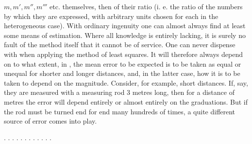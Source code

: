 $m, m', m'', m'''$ etc. themselves, then of their ratio (i. e. the ratio of the numbers by which they are expressed, with arbitrary units chosen for each in the heterogeneous case). With ordinary ingenuity one can almost always find at least some means of estimation. Where all knowledge is entirely lacking, it is surely no fault of the method itself that it cannot be of service. One can never dispense with  when applying the method of least squares. It will therefore always depend on  to what extent, in , the mean error to be expected is to be taken as equal or unequal for shorter and longer distances, and, in the latter case, how it is to be taken to depend on the magnitude. Consider, for example, short distances. If, say, they are measured with a measuring rod 3 metres long, then for a distance of  metres the error will depend entirely or almost entirely on the graduations. But if the rod must be turned end for end many hundreds of times, a quite different source of error comes into play.

\begin{center}
. . . . . . . . . . . .
\end{center}
